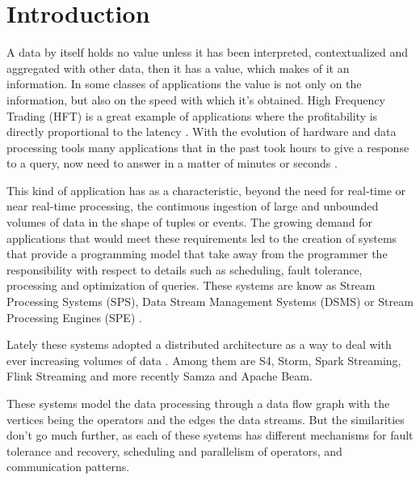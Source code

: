 \documentclass[ppgc,diss,english]{iiufrgs}
\begin{document}
\chapter{Introduction}


A data by itself holds no value unless it has been interpreted, contextualized and aggregated with other data, then it has a value, which makes of it an information. In some classes of applications the value is not only on the information, but also on the speed with which it's obtained. High Frequency Trading (HFT) is a great example of applications where the profitability is directly proportional to the latency \cite{Loveless:2013:OAH:2507771.2507780}. With the evolution of hardware and data processing tools many applications that in the past took hours to give a response to a query, now need to answer in a matter of minutes or seconds \cite{barlow2013real}. 

This kind of application has as a characteristic, beyond the need for real-time or near real-time processing, the continuous ingestion of large and unbounded volumes of data in the shape of tuples or events. The growing demand for applications that would meet these requirements led to the creation of systems that provide a programming model that take away from the programmer the responsibility with respect to details such as scheduling, fault tolerance, processing and optimization of queries. These systems are know as Stream Processing Systems (SPS), Data Stream Management Systems (DSMS) \cite{chakravarthy2009stream} or Stream Processing Engines (SPE) \cite{abadi2005design}.

Lately these systems adopted a distributed architecture as a way to deal with ever increasing volumes of data \cite{zaharia2012discretized}. Among them are S4, Storm, Spark Streaming, Flink Streaming and more recently Samza and Apache Beam.

These systems model the data processing through a data flow graph with the vertices being the operators and the edges the data streams. But the similarities don't go much further, as each of these systems has different mechanisms for fault tolerance and recovery, scheduling and parallelism of operators, and communication patterns.
\end{document}
